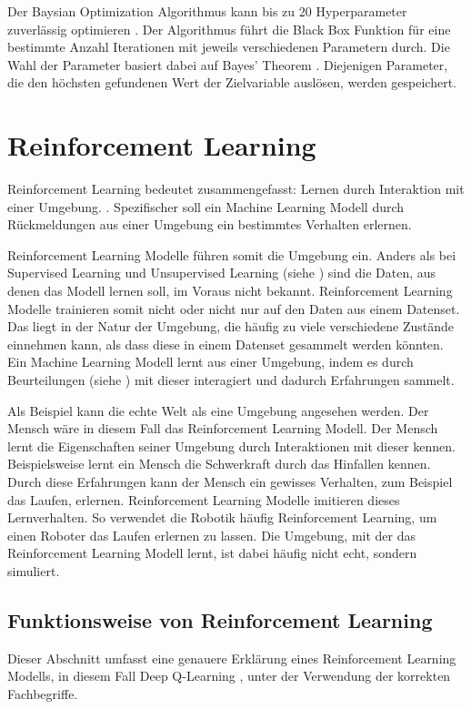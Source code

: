 Der Baysian Optimization Algorithmus kann bis zu 20 Hyperparameter zuverlässig
optimieren \cite{moriconi_high-dimensional_2020}. Der Algorithmus führt die
Black Box Funktion für eine bestimmte Anzahl Iterationen mit jeweils
verschiedenen Parametern durch. Die Wahl der Parameter basiert dabei auf Bayes'
Theorem \cite[S. 7]{garnett_bayesian_nodate}. Diejenigen Parameter, die den
höchsten gefundenen Wert der Zielvariable auslösen, werden gespeichert.
 
 
\section{Reinforcement Learning}\label{chap:t_rl}
Reinforcement Learning bedeutet zusammengefasst: Lernen durch Interaktion mit
einer Umgebung. \cite{osinski_what_2018}. Spezifischer soll ein Machine
Learning Modell durch Rückmeldungen aus einer Umgebung ein bestimmtes Verhalten
erlernen.
 
Reinforcement Learning Modelle führen somit die Umgebung ein. Anders als bei
Supervised Learning und Unsupervised Learning (siehe ) sind
die Daten, aus denen das Modell lernen soll, im Voraus nicht bekannt.
Reinforcement Learning Modelle trainieren somit nicht oder nicht nur auf den
Daten aus einem Datenset. Das liegt in der Natur der Umgebung, die häufig zu
viele verschiedene Zustände einnehmen kann, als dass diese in einem Datenset
gesammelt werden könnten. Ein Machine Learning Modell lernt aus einer Umgebung,
indem es durch Beurteilungen (siehe ) mit dieser
interagiert und dadurch Erfahrungen sammelt.
\cite{piyush_verma_what_2021}
 
Als Beispiel kann die echte Welt als eine Umgebung angesehen werden. Der Mensch
wäre in diesem Fall das Reinforcement Learning Modell. Der Mensch lernt die
Eigenschaften seiner Umgebung durch Interaktionen mit dieser kennen.
Beispielsweise lernt ein Mensch die Schwerkraft durch das Hinfallen kennen.
Durch diese Erfahrungen kann der Mensch ein gewisses Verhalten, zum Beispiel das
Laufen, erlernen. Reinforcement Learning Modelle imitieren dieses Lernverhalten.
So verwendet die Robotik häufig Reinforcement Learning, um einen Roboter das
Laufen erlernen zu lassen. Die Umgebung, mit der das Reinforcement Learning
Modell lernt, ist dabei häufig nicht echt, sondern simuliert.
 
\subsection{Funktionsweise von Reinforcement Learning}\label{sub:t_rl_func}
Dieser Abschnitt umfasst eine genauere Erklärung eines Reinforcement Learning
Modells, in diesem Fall Deep Q-Learning \cite{mnih_playing_2013}, unter der
Verwendung der korrekten Fachbegriffe.
 
